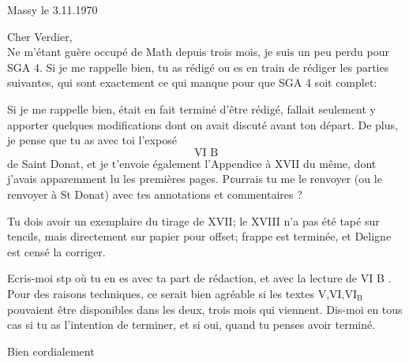 \begin{flushright}
Massy le 3.11.1970\\
\end{flushright}
Cher Verdier,\\

Ne m'étant guère occupé de Math depuis trois mois, je suis un peu perdu pour SGA 4. Si je me rappelle bien, tu as rédigé ou es en train de rédiger les parties suivantes, qui sont exactement ce qui manque pour que SGA 4 soit complet:

Si je me rappelle bien,  était en fait terminé d'être rédigé,  fallait seulement y apporter quelques modifications dont on avait discuté avant ton départ. De plus, je pense que tu as avec toi l'exposé
\[
\text{VI B}
\]
de Saint Donat, et je t'envoie également l'Appendice à XVII du même, dont j'avais apparemment lu les premières pages. P\(\mathbb{o}\)urrais tu me le renvoyer (ou le renvoyer à St Donat) avec tes annotations et commentaires ?

Tu dois avoir un exemplaire du tirage de XVII; le XVIII n'a pas été tapé sur tencils, mais directement sur papier pour offset;  frappe est terminée, et Deligne est censé la corriger.

Ecris-moi stp où tu en es avec ta part de rédaction, et avec la lecture de VI B .  Pour des raisons techniques, ce serait bien agréable si les textes V,VI,\(\mathrm{VI}_{\mathrm{B}}\) pouvaient être disponibles dans les deux, trois mois qui viennent. Dis-moi en tous cas si tu as l'intention de terminer, et si oui, quand tu penses avoir terminé.

Bien cordialement\\
